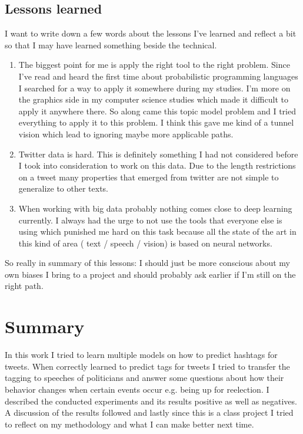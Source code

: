 \documentclass[10pt,conference,compsocconf]{IEEEtran}
\begin{document}
\subsection{Lessons learned}
I want to write down a few words about the lessons I've learned and reflect a bit so that I may have learned something beside the technical. 
\begin{enumerate}
	\item The biggest point for me is apply the right tool to the right problem. Since I've read and heard the first time about probabilistic programming languages I searched for a way to apply it somewhere during my studies. I'm more on the graphics side in my computer science studies which made it difficult to apply it anywhere there. So along came this topic model problem and I tried everything to apply it to this problem. I think this gave me kind of a tunnel vision which lead to ignoring maybe more applicable paths.
	\item Twitter data is hard. This is definitely something I had not considered before I took into consideration to work on this data. Due to the length restrictions on a tweet many properties that emerged from twitter are not simple to generalize to other texts. 
	\item When working with big data probably nothing comes close to deep learning currently. I always had the urge to not use the tools that everyone else is using which punished me hard on this task because all the state of the art in this kind of area ( text / speech / vision) is based on neural networks. 
\end{enumerate}
So really in summary of this lessons: I should just be more conscious about my own biases I bring to a project and should probably ask earlier if I'm still on the right path. 


\section{Summary}
\label{sec:Summary}
In this work I tried to learn multiple models on how to predict hashtags for tweets. When correctly learned to predict tags for tweets I tried to transfer the tagging to speeches of politicians and answer some questions about how their behavior changes when certain events occur e.g. being up for reelection. I described the conducted experiments and its results positive as well as negatives. A discussion of the results followed and lastly since this is a class project I tried to reflect on my methodology and what I can make better next time. 
\end{document}
